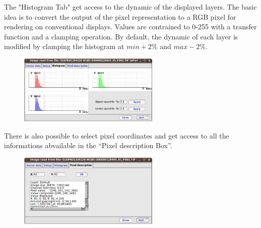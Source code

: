 The "Histogram Tab" get access to the dynamic of the displayed
layers. The basic idea is to convert the output of the pixel
representation to a RGB pixel for rendering on conventional displays.
Values are contrained to 0-255 with a transfer function and a clamping
operation.  By default, the dynamic of each layer is modified by
clamping the histogram at $min + 2\%$ and $max - 2\%$.

\begin{figure}
  \center
  \includegraphics[width=0.6\textwidth]{../Art/MonteverdiImages/monteverdi_viewer_histogram.png}
  \label{fig:histogram}
\end{figure}

There is also possible to select pixel coordinates and get access to all the informations abvailable in the ``Pixel description 
Box''.

\begin{figure}
  \center
  \includegraphics[width=0.6\textwidth]{../Art/MonteverdiImages/monteverdi_viewer_pixel_description.png}
  \label{fig:pixeldescriptioninformations}
\end{figure}

